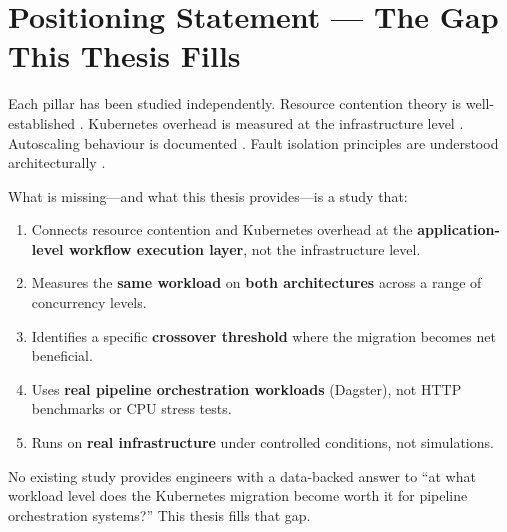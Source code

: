 
\section{Positioning Statement --- The Gap This Thesis Fills}
\label{sec:positioning}

Each pillar has been studied independently. Resource contention theory is well-established \citep{nanda1991, arora2023}. Kubernetes overhead is measured at the infrastructure level \citep{casalicchio2019, liu2024}. Autoscaling behaviour is documented \citep{nguyen2020, tran2022, choi2021}. Fault isolation principles are understood architecturally \citep{cilic2023}.

What is missing---and what this thesis provides---is a study that:

\begin{enumerate}
  \item Connects resource contention and Kubernetes overhead at the \textbf{application-level workflow execution layer}, not the infrastructure level.
  \item Measures the \textbf{same workload} on \textbf{both architectures} across a range of concurrency levels.
  \item Identifies a specific \textbf{crossover threshold} where the migration becomes net beneficial.
  \item Uses \textbf{real pipeline orchestration workloads} (Dagster), not HTTP benchmarks or CPU stress tests.
  \item Runs on \textbf{real infrastructure} under controlled conditions, not simulations.
\end{enumerate}

No existing study provides engineers with a data-backed answer to ``at what workload level does the Kubernetes migration become worth it for pipeline orchestration systems?'' This thesis fills that gap.
